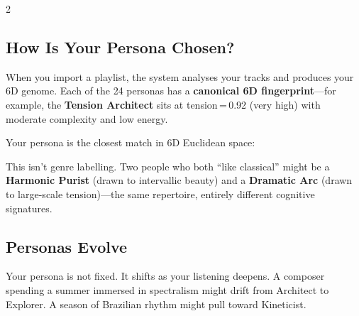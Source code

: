 \documentclass[10pt,a4paper]{article}
\begin{document}
\begin{center}
\end{center}

\vspace{4pt}

\begin{multicols}{2}

\subsection{How Is Your Persona Chosen?}

When you import a playlist, the system analyses your tracks and produces your 6D genome. Each of the 24 personas has a \textbf{canonical 6D fingerprint}---for example, the \textcolor{alch}{\textbf{Tension Architect}} sits at tension\,=\,0.92 (very high) with moderate complexity and low energy.

Your persona is the closest match in 6D Euclidean space:

\begin{center}
\end{center}

\smallskip
This isn't genre labelling. Two people who both ``like classical'' might be a \textcolor{arch}{\textbf{Harmonic Purist}} (drawn to intervallic beauty) and a \textcolor{alch}{\textbf{Dramatic Arc}} (drawn to large-scale tension)---the same repertoire, entirely different cognitive signatures.

\columnbreak

\subsection{Personas Evolve}

Your persona is not fixed. It shifts as your listening deepens. A composer spending a summer immersed in spectralism might drift from Architect to Explorer. A season of Brazilian rhythm might pull toward Kineticist.


\end{multicols}
\end{document}
